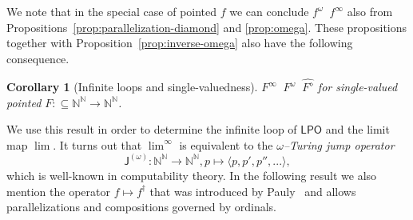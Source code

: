 \documentclass[11pt,a4paper]{amsart}
\theoremstyle{plain}
\newtheorem{cor}[thm]{Corollary}
\theoremstyle{definition}
\theoremstyle{defC}
\theoremstyle{thmC}
\theoremstyle{plain}
\numberwithin{equation}{section}
\def\IN{{\mathbb{N}}}
\def\In{\subseteq}
\def\J{{\mathsf{{J}}}}
\def\LPO{\mathsf{LPO}}
\def\leqSW{\mathop{\leq_{\mathrm{sW}}}}
\def\equivSW{\mathop{\equiv_{\mathrm{sW}}}}
\def\leqSW{\mathop{\leq_{\mathrm{sW}}}}
\def\equivSW{\mathop{\equiv_{\mathrm{sW}}}}
\begin{document}
\noindent
We note that in the special case of pointed $f$ we can conclude $f^\omega\leqSW f^\infty$ also
from Propositions~\ref{prop:parallelization-diamond} and \ref{prop:omega}.
These propositions together with Proposition~\ref{prop:inverse-omega} also have the following consequence.

\begin{cor}[Infinite loops and single-valuedness]
\label{cor:single-valued}
$F^\infty\equivSW F^\omega\equivSW\widehat{F^\diamond}$ for single-valued pointed $F:\In\IN^\IN\to\IN^\IN$.
\end{cor}

\noindent
We use this result in order to determine the infinite loop of $\LPO$ and the limit map $\lim$.
It turns out that $\lim^\infty$ is equivalent to the {\em $\omega$--Turing jump operator}
\[\J^{(\omega)}:\IN^\IN\to\IN^\IN,p\mapsto\langle p,p',p'',...\rangle,\]
which is well-known in computability theory.
In the following result we also mention the operator $f\mapsto f^\dagger$ that was introduced by Pauly~\cite{Pau15}
and allows parallelizations and compositions governed by ordinals.
\end{document}
